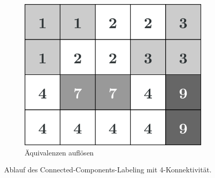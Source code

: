 \begin{figure}[H]
  \begin{subfigure}[t]{0.327\columnwidth}
    \centering
    \includegraphics[width=\columnwidth]{img/basics/connected-compontents/labeling-3}
    \caption{Äquivalenzen auflösen}
  \end{subfigure}
  \caption[Ablauf des Connected-Components-Labeling]{Ablauf des Connected-Components-Labeling mit 4-Konnektivität.}
\end{figure}
